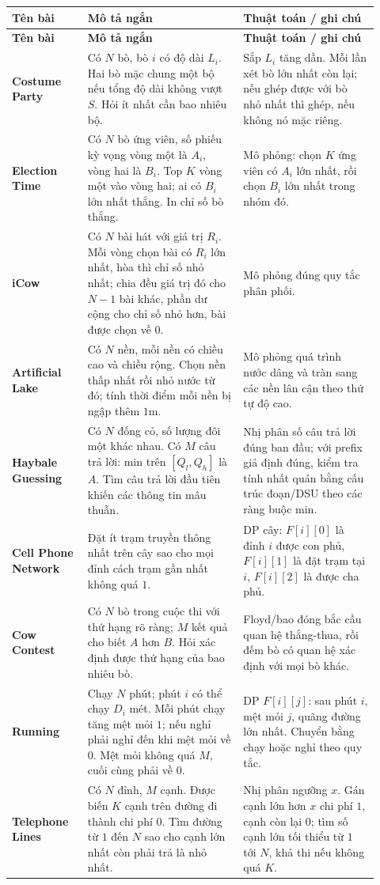 \documentclass[11pt]{article}
\newenvironment{solutiontable}{%
  \small
  \setlength{\tabcolsep}{4pt}
  \renewcommand{\arraystretch}{1.14}
  \begin{longtable}{L{0.19\linewidth}L{0.39\linewidth}L{0.34\linewidth}}
  \toprule
  \textbf{Tên bài} & \textbf{Mô tả ngắn} & \textbf{Thuật toán / ghi chú}\\
  \midrule
  \endfirsthead
  \toprule
  \textbf{Tên bài} & \textbf{Mô tả ngắn} & \textbf{Thuật toán / ghi chú}\\
  \midrule
  \endhead
}{%
  \bottomrule
  \end{longtable}
  \normalsize
}
\newcommand{\problemrow}[3]{\textbf{#1} & #2 & #3\\\midrule}
\begin{document}
\begin{solutiontable}
\problemrow{Costume Party}{Có \(N\) bò, bò \(i\) có độ dài \(L_i\). Hai bò mặc chung một bộ nếu tổng độ dài không vượt \(S\). Hỏi ít nhất cần bao nhiêu bộ.}{Sắp \(L_i\) tăng dần. Mỗi lần xét bò lớn nhất còn lại; nếu ghép được với bò nhỏ nhất thì ghép, nếu không nó mặc riêng.}
\problemrow{Election Time}{Có \(N\) bò ứng viên, số phiếu kỳ vọng vòng một là \(A_i\), vòng hai là \(B_i\). Top \(K\) vòng một vào vòng hai; ai có \(B_i\) lớn nhất thắng. In chỉ số bò thắng.}{Mô phỏng: chọn \(K\) ứng viên có \(A_i\) lớn nhất, rồi chọn \(B_i\) lớn nhất trong nhóm đó.}
\problemrow{iCow}{Có \(N\) bài hát với giá trị \(R_i\). Mỗi vòng chọn bài có \(R_i\) lớn nhất, hòa thì chỉ số nhỏ nhất; chia đều giá trị đó cho \(N-1\) bài khác, phần dư cộng cho chỉ số nhỏ hơn, bài được chọn về \(0\).}{Mô phỏng đúng quy tắc phân phối.}
\problemrow{Artificial Lake}{Có \(N\) nền, mỗi nền có chiều cao và chiều rộng. Chọn nền thấp nhất rồi nhỏ nước từ đó; tính thời điểm mỗi nền bị ngập thêm \(1\)m.}{Mô phỏng quá trình nước dâng và tràn sang các nền lân cận theo thứ tự độ cao.}
\problemrow{Haybale Guessing}{Có \(N\) đống cỏ, số lượng đôi một khác nhau. Có \(M\) câu trả lời: min trên \([Q_l,Q_h]\) là \(A\). Tìm câu trả lời đầu tiên khiến các thông tin mâu thuẫn.}{Nhị phân số câu trả lời đúng ban đầu; với prefix giả định đúng, kiểm tra tính nhất quán bằng cấu trúc đoạn/DSU theo các ràng buộc min.}
\problemrow{Cell Phone Network}{Đặt ít trạm truyền thông nhất trên cây sao cho mọi đỉnh cách trạm gần nhất không quá \(1\).}{DP cây: \(F[i][0]\) là đỉnh \(i\) được con phủ, \(F[i][1]\) là đặt trạm tại \(i\), \(F[i][2]\) là được cha phủ.}
\problemrow{Cow Contest}{Có \(N\) bò trong cuộc thi với thứ hạng rõ ràng; \(M\) kết quả cho biết \(A\) hơn \(B\). Hỏi xác định được thứ hạng của bao nhiêu bò.}{Floyd/bao đóng bắc cầu quan hệ thắng-thua, rồi đếm bò có quan hệ xác định với mọi bò khác.}
\problemrow{Running}{Chạy \(N\) phút; phút \(i\) có thể chạy \(D_i\) mét. Mỗi phút chạy tăng mệt mỏi \(1\); nếu nghỉ phải nghỉ đến khi mệt mỏi về \(0\). Mệt mỏi không quá \(M\), cuối cùng phải về \(0\).}{DP \(F[i][j]\): sau phút \(i\), mệt mỏi \(j\), quãng đường lớn nhất. Chuyển bằng chạy hoặc nghỉ theo quy tắc.}
\problemrow{Telephone Lines}{Có \(N\) đỉnh, \(M\) cạnh. Được biến \(K\) cạnh trên đường đi thành chi phí \(0\). Tìm đường từ \(1\) đến \(N\) sao cho cạnh lớn nhất còn phải trả là nhỏ nhất.}{Nhị phân ngưỡng \(x\). Gán cạnh lớn hơn \(x\) chi phí \(1\), cạnh còn lại \(0\); tìm số cạnh lớn tối thiểu từ \(1\) tới \(N\), khả thi nếu không quá \(K\).}
\end{solutiontable}
\end{document}
